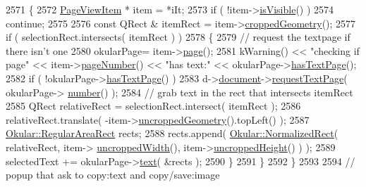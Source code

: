 \begin{DoxyCode}
2571                 \{
2572                     \hyperlink{classPageViewItem}{PageViewItem} * item = *iIt;
2573                     \textcolor{keywordflow}{if} ( !item->\hyperlink{classPageViewItem_ae7a4dfa618d0cb56e01075842c67bf9f}{isVisible}() )
2574                         \textcolor{keywordflow}{continue};
2575 
2576                     \textcolor{keyword}{const} QRect & itemRect = item->\hyperlink{classPageViewItem_aa2c3e988ccbe9ee162b73d7f89ab0d02}{croppedGeometry}();
2577                     \textcolor{keywordflow}{if} ( selectionRect.intersects( itemRect ) )
2578                     \{
2579                         \textcolor{comment}{// request the textpage if there isn't one}
2580                         okularPage= item->\hyperlink{classPageViewItem_a5c512d95e5563e8d19d1fb3d93dafc31}{page}();
2581                         kWarning() << \textcolor{stringliteral}{"checking if page"} << item->\hyperlink{classPageViewItem_ad75aab4c1ffd842bd5d54c0cfe84d1bf}{pageNumber}() << \textcolor{stringliteral}{"has text:"} << 
      okularPage->\hyperlink{classOkular_1_1Page_a44163bc0e76204a9d9c42da442ee734a}{hasTextPage}();
2582                         \textcolor{keywordflow}{if} ( !okularPage->\hyperlink{classOkular_1_1Page_a44163bc0e76204a9d9c42da442ee734a}{hasTextPage}() )
2583                             d->\hyperlink{classPageViewPrivate_a50645b9853306cffd74e51efb677e5b4}{document}->\hyperlink{classOkular_1_1Document_ad4909d8411d3ad8faf716f30a6e9f417}{requestTextPage}( okularPage->
      \hyperlink{classOkular_1_1Page_a6eee5f157a130b47d81ddd63e501664b}{number}() );
2584                         \textcolor{comment}{// grab text in the rect that intersects itemRect}
2585                         QRect relativeRect = selectionRect.intersect( itemRect );
2586                         relativeRect.translate( -item->\hyperlink{classPageViewItem_a5d2e73a003f65b4e95c0c21b1698f835}{uncroppedGeometry}().topLeft() );
2587                         \hyperlink{classOkular_1_1RegularAreaRect}{Okular::RegularAreaRect} rects;
2588                         rects.append( \hyperlink{classOkular_1_1NormalizedRect}{Okular::NormalizedRect}( relativeRect, item->
      \hyperlink{classPageViewItem_a240924407ae22bb0489363a6a2d481b9}{uncroppedWidth}(), item->\hyperlink{classPageViewItem_af1380fce5dc13a72458ef834c720b128}{uncroppedHeight}() ) );
2589                         selectedText += okularPage->\hyperlink{classOkular_1_1Page_a11ab0f2abe5c1e760c046a33fd5393f3}{text}( &rects );
2590                     \}
2591                 \}
2592             \}
2593 
2594             \textcolor{comment}{// popup that ask to copy:text and copy/save:image}

\end{DoxyCode}
